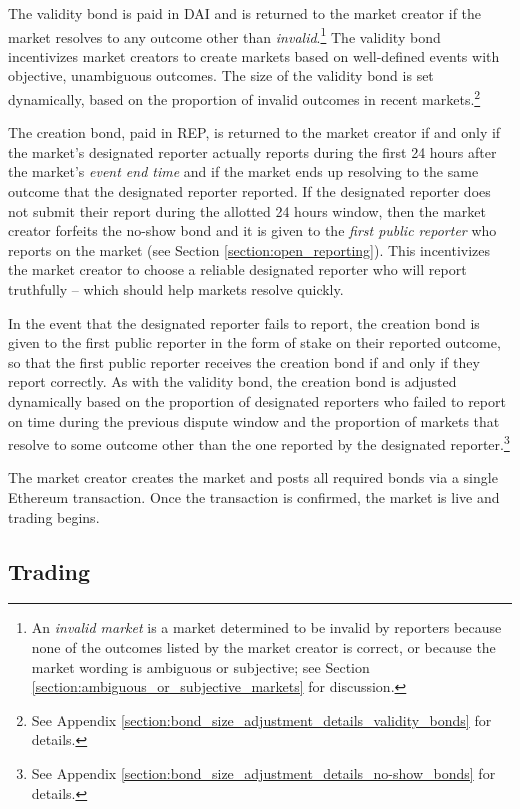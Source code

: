 \documentclass[floatfix,reprint,nofootinbib,amsmath,amssymb,epsfig,pre,floats,letterpaper,groupedaffiliation]{revtex4-1}
\theoremstyle{definition}
\theoremstyle{definition}
\begin{document}
The validity bond is paid in DAI and is returned to the market creator if the market resolves to any outcome other than \textit{invalid}.\footnote{An \textit{invalid market} is a market determined to be invalid by reporters because none of the outcomes listed by the market creator is correct, or because the market wording is ambiguous or subjective; see Section \ref{section:ambiguous_or_subjective_markets} for discussion.}  The validity bond incentivizes market creators to create markets based on well-defined events with objective, unambiguous outcomes.  The size of the validity bond is set dynamically, based on the proportion of invalid outcomes in recent markets.\footnote{See Appendix \ref{section:bond_size_adjustment_details_validity_bonds} for details.}

The creation bond, paid in REP, is returned to the market creator if and only if the market's designated reporter actually reports during the first 24 hours after the market's \textit{event end time} and if the market ends up resolving to the same outcome that the designated reporter reported. If the designated reporter does not submit their report during the allotted 24 hours window, then the market creator forfeits the no-show bond and it is given to the \textit{first public reporter} who reports on the market (see Section \ref{section:open_reporting}).  This incentivizes the market creator to choose a reliable designated reporter who will report truthfully -- which should help markets resolve quickly.

In the event that the designated reporter fails to report, the creation bond is given to the first public reporter in the form of stake on their reported outcome, so that the first public reporter receives the creation bond if and only if they report correctly.  As with the validity bond, the creation bond is adjusted dynamically based on the proportion of designated reporters who failed to report on time during the previous dispute window and the proportion of markets that resolve to some outcome other than the one reported by the designated reporter.\footnote{See Appendix \ref{section:bond_size_adjustment_details_no-show_bonds} for details.}

The market creator creates the market and posts all required bonds via a single Ethereum transaction.  Once the transaction is confirmed, the market is live and trading begins.

\subsection{Trading}
\end{document}
